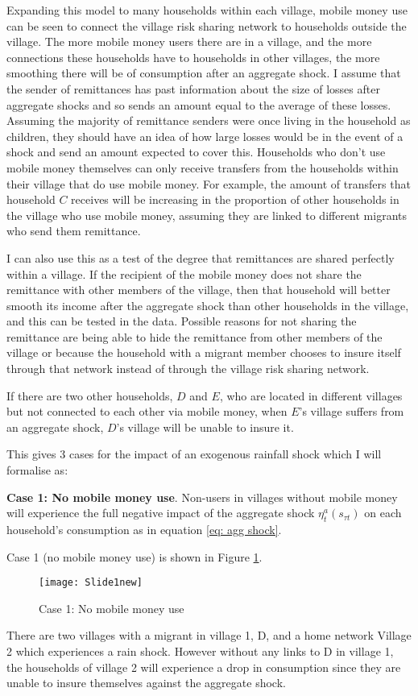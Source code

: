 Expanding this model to many households within each village, mobile money use can be seen to connect the village risk sharing network to households outside the village. The more mobile money users there are in a village, and the more connections these households have to households in other villages, the more smoothing there will be of consumption after an aggregate shock. I assume that the sender of remittances has past information about the size of losses after aggregate shocks and so sends an amount equal to the average of these losses. Assuming the majority of remittance senders were once living in the household as children, they should have an idea of how large losses would be in the event of a shock and send an amount expected to cover this.  Households who don't use mobile money themselves can only receive transfers from the households within their village that do use mobile money. For example, the amount of transfers that household $C$ receives will be increasing in the proportion of other households in the village who use mobile money, assuming they are linked to different migrants who send them remittance. 

I can also use this as a test of the degree that remittances are shared perfectly within a village. If the recipient of the mobile money does not share the remittance with other members of the village, then that household will better smooth its income after the aggregate shock than other households in the village, and this can be tested in the data. Possible reasons for not sharing the remittance are being able to hide the remittance from other members of the village or because the household with a migrant member chooses to insure itself through that network instead of through the village risk sharing network. 

If there are two other households, $D$ and $E$, who are located in different villages but not connected to each other via mobile money, when $E$'s village suffers from an aggregate shock, $D$'s village will be unable to insure it. 

This gives 3 cases for the impact of an exogenous rainfall shock which I will formalise as: 

\textbf{Case 1: No mobile money use}. Non-users in villages without mobile money will experience the full negative impact of the aggregate shock $\eta_t^a(s_{\tau t})$  on each household's consumption as in equation \eqref{eq: agg shock}. 

Case 1 (no mobile money use) is shown in Figure \ref{fig: no link}. 
\begin{figure}[h]
    \centering
    \texttt{[image: Slide1new]}
\caption{Case 1: No mobile money use}
    \label{fig: no link}
\end{figure}
There are two villages with a migrant in village 1, D, and a home network Village 2 which experiences a rain shock. However without any links to D in village 1, the households of village 2 will experience a drop in consumption since they are unable to insure themselves against the aggregate shock.

